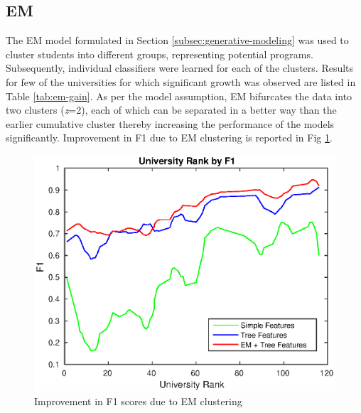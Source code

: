 \documentclass{sig-alternate-05-2015}
\begin{document}
\subsection{EM}
\label{subsec:em-exp}
The EM model formulated in Section \ref{subsec:generative-modeling} was used to cluster students into different groups, representing potential programs. Subsequently, individual classifiers were learned for each of the clusters. Results for few of the universities for which significant growth was observed are listed in Table \ref{tab:em-gain}. As per the model assumption, EM bifurcates the data into two clusters (\textit{z}=2), each of which can be separated in a better way than the earlier cumulative cluster thereby increasing the performance of the models significantly. Improvement in F1 due to EM clustering is reported in Fig \ref{fig:simple_vs_tree_vs_em}.

\begin{figure}[t]
\centering
\includegraphics[scale=0.6]{simple_vs_tree_vs_em.eps}
\caption{Improvement in F1 scores due to EM clustering}
\label{fig:simple_vs_tree_vs_em}
\end{figure}
\end{document}
